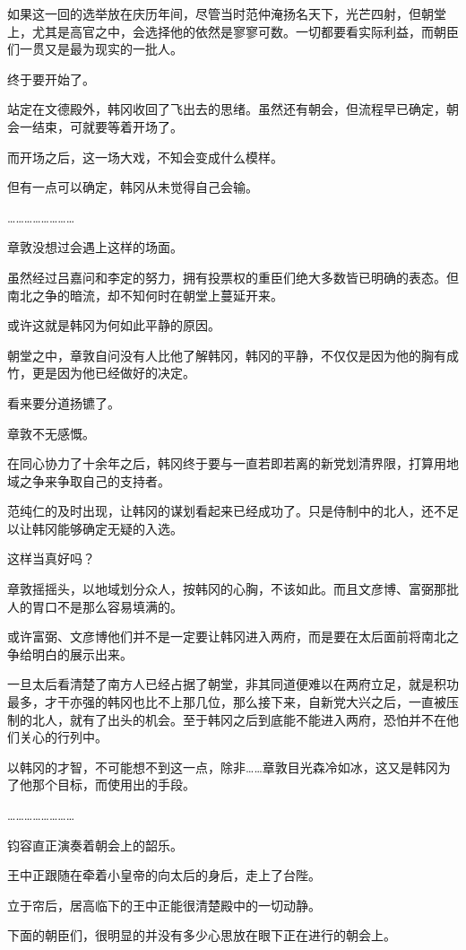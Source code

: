 如果这一回的选举放在庆历年间，尽管当时范仲淹扬名天下，光芒四射，但朝堂上，尤其是高官之中，会选择他的依然是寥寥可数。一切都要看实际利益，而朝臣们一贯又是最为现实的一批人。

终于要开始了。

站定在文德殿外，韩冈收回了飞出去的思绪。虽然还有朝会，但流程早已确定，朝会一结束，可就要等着开场了。

而开场之后，这一场大戏，不知会变成什么模样。

但有一点可以确定，韩冈从未觉得自己会输。

……………………

章敦没想过会遇上这样的场面。

虽然经过吕嘉问和李定的努力，拥有投票权的重臣们绝大多数皆已明确的表态。但南北之争的暗流，却不知何时在朝堂上蔓延开来。

或许这就是韩冈为何如此平静的原因。

朝堂之中，章敦自问没有人比他了解韩冈，韩冈的平静，不仅仅是因为他的胸有成竹，更是因为他已经做好的决定。

看来要分道扬镳了。

章敦不无感慨。

在同心协力了十余年之后，韩冈终于要与一直若即若离的新党划清界限，打算用地域之争来争取自己的支持者。

范纯仁的及时出现，让韩冈的谋划看起来已经成功了。只是侍制中的北人，还不足以让韩冈能够确定无疑的入选。

这样当真好吗？

章敦摇摇头，以地域划分众人，按韩冈的心胸，不该如此。而且文彦博、富弼那批人的胃口不是那么容易填满的。

或许富弼、文彦博他们并不是一定要让韩冈进入两府，而是要在太后面前将南北之争给明白的展示出来。

一旦太后看清楚了南方人已经占据了朝堂，非其同道便难以在两府立足，就是积功最多，才干亦强的韩冈也比不上那几位，那么接下来，自新党大兴之后，一直被压制的北人，就有了出头的机会。至于韩冈之后到底能不能进入两府，恐怕并不在他们关心的行列中。

以韩冈的才智，不可能想不到这一点，除非……章敦目光森冷如冰，这又是韩冈为了他那个目标，而使用出的手段。

……………………

钧容直正演奏着朝会上的韶乐。

王中正跟随在牵着小皇帝的向太后的身后，走上了台陛。

立于帘后，居高临下的王中正能很清楚殿中的一切动静。

下面的朝臣们，很明显的并没有多少心思放在眼下正在进行的朝会上。

